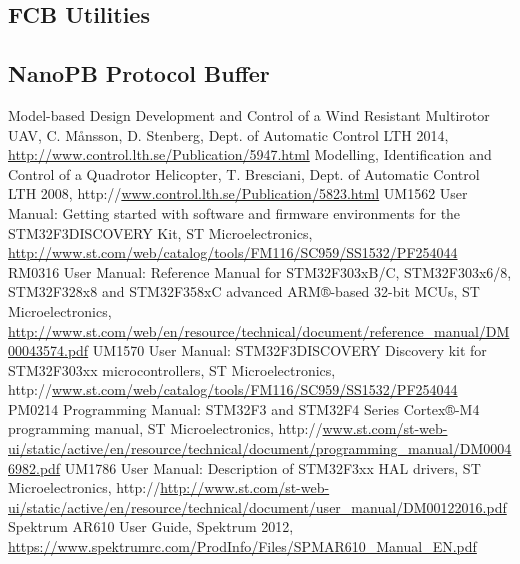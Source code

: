 \documentclass[a4paper]{report}
\begin{document}
		\subsection{FCB Utilities}

		\subsection{NanoPB Protocol Buffer}

\begin{thebibliography}{99}
 Model-based Design Development and Control of a Wind Resistant Multirotor UAV, C. Månsson, D. Stenberg, Dept. of Automatic Control LTH 2014, \url{http://www.control.lth.se/Publication/5947.html}
 Modelling, Identification and Control of a Quadrotor Helicopter, T. Bresciani, Dept. of Automatic Control LTH 2008, http://\url{www.control.lth.se/Publication/5823.html}
 UM1562 User Manual: Getting started with software and firmware environments for the STM32F3DISCOVERY Kit, ST Microelectronics, \url{http://www.st.com/web/catalog/tools/FM116/SC959/SS1532/PF254044}
 RM0316 User Manual: Reference Manual for  STM32F303xB/C, STM32F303x6/8, STM32F328x8 and STM32F358xC advanced ARM®-based 32-bit MCUs, ST Microelectronics, \url{http://www.st.com/web/en/resource/technical/document/reference_manual/DM00043574.pdf}
UM1570 User Manual: STM32F3DISCOVERY Discovery kit for STM32F303xx microcontrollers, ST Microelectronics, http://\url{www.st.com/web/catalog/tools/FM116/SC959/SS1532/PF254044}
PM0214 Programming Manual: STM32F3 and STM32F4 Series Cortex®-M4 programming manual, ST Microelectronics, http://\url{www.st.com/st-web-ui/static/active/en/resource/technical/document/programming_manual/DM00046982.pdf}
UM1786 User Manual: Description of STM32F3xx HAL drivers, ST Microelectronics, http://\url{http://www.st.com/st-web-ui/static/active/en/resource/technical/document/user_manual/DM00122016.pdf}
Spektrum AR610 User Guide, Spektrum 2012, \url{https://www.spektrumrc.com/ProdInfo/Files/SPMAR610_Manual_EN.pdf}

\end{thebibliography}
\end{document}
